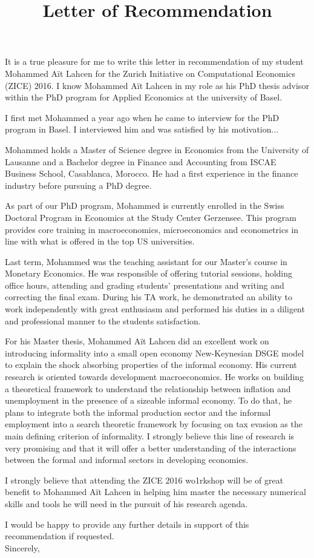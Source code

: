 \documentclass[10pt,a4paper]{article}
\title{Letter of Recommendation}
\date{}
\begin{document}
\maketitle

It is a true pleasure for me to write this letter in recommendation of my student Mohammed Aït Lahcen for the Zurich Initiative on Computational Economics (ZICE) 2016. I know Mohammed Aït Lahcen in my role as his PhD thesis advisor within the PhD program for Applied Economics at the university of Basel.

I first met Mohammed a year ago when he came to interview for the PhD program in Basel. I interviewed him and was satisfied by his motivation... 

Mohammed holds a Master of Science degree in Economics from the University of Lausanne and a Bachelor degree in Finance and Accounting from ISCAE Business School, Casablanca, Morocco. He had a first experience in the finance industry before pursuing a PhD degree.

As part of our PhD program, Mohammed is currently enrolled in the Swiss Doctoral Program in Economics at the Study Center Gerzensee. This program provides core training in macroeconomics, microeconomics and econometrics in line with what is offered in the top US universities.

Last term, Mohammed was the teaching assistant for our Master's course in Monetary Economics. He was responsible of offering tutorial sessions, holding office hours, attending and grading students' presentations and writing and correcting the final exam. During his TA work, he demonstrated an ability to work independently with great enthusiasm and performed his duties in a diligent and professional manner to the students satisfaction.

For his Master thesis, Mohammed Aït Lahcen did an excellent work on introducing informality into a small open economy New-Keynesian DSGE model to explain the shock absorbing properties of the informal economy. His current research is oriented towards development macroeconomics. He works on building a theoretical framework to understand the relationship between inflation and unemployment in the presence of a sizeable informal economy. To do that, he plans to integrate both the informal production sector and the informal employment into a search theoretic framework by focusing on tax evasion as the main defining criterion of informality. I strongly believe this line of research is very promising and that it will offer a better understanding of the interactions between the formal and informal sectors in developing economies.

I strongly believe that attending the ZICE 2016 wo1rkshop will be of great benefit to Mohammed Aït Lahcen in helping him master the necessary numerical skills and tools he will need in the pursuit of his research agenda.

I would be happy to provide any further details in support of this recommendation if requested.
\\


Sincerely,
\end{document}

